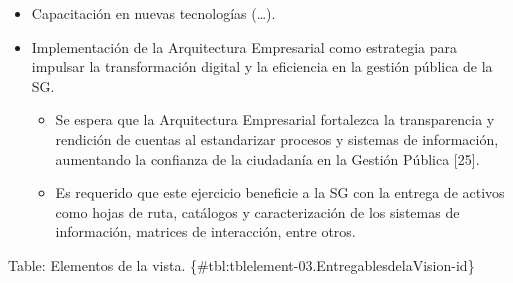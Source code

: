 \documentclass[
	a4paper, %
	12pt, %
]{include/CSSullivanBusinessReport}
\def\tightlist{}
\begin{document}
\begin{itemize}
  \begin{itemize}
  \tightlist
  \item
    Se busca la consolidación de herramientas, canales e información
    para fortalecer la oferta y celeridad de servicios y la
    participación ciudadana {[}11{]}. Esto incluye el seguimiento a
    canales de atención virtual como SuperCADE Virtual, chat, chat-Bot y
    videollamadas de la línea 195 {[}11{]}.
  \item
    Se busca optimizar los procesos de recolección, análisis y
    divulgación de la información mediante la implementación de sistemas
    de información que contengan la automatización de la recolección de
    datos y el uso de herramientas analíticas {[}15{]}.
  \item
    Una noticia reciente destaca que el Distrito unifica en el portal
    Bogotá su oferta de trámites y servicios, el cual permite acceder a
    más de 1.400 trámites y servicios y realizar pagos en línea (no
    tributarios) y agendamiento de citas en la RedCADE desde casa
    {[}40{]}. Esto representa una mejora significativa en la
    accesibilidad y eficiencia de los servicios digitales para la
    ciudadanía.
  \end{itemize}
\item
  Capacitación en nuevas tecnologías (\ldots).
\item
  Implementación de la Arquitectura Empresarial como estrategia para
  impulsar la transformación digital y la eficiencia en la gestión
  pública de la SG.

  \begin{itemize}
  \tightlist
  \item
    Se espera que la Arquitectura Empresarial fortalezca la
    transparencia y rendición de cuentas al estandarizar procesos y
    sistemas de información, aumentando la confianza de la ciudadanía en
    la Gestión Pública {[}25{]}.
  \item
    Es requerido que este ejercicio beneficie a la SG con la entrega de
    activos como hojas de ruta, catálogos y caracterización de los
    sistemas de información, matrices de interacción, entre otros.
  \end{itemize}
\end{itemize}

\textbar{}

Table: Elementos de la vista.
\{\#tbl:tblelement-03.EntregablesdelaVision-id\}
\end{document}
